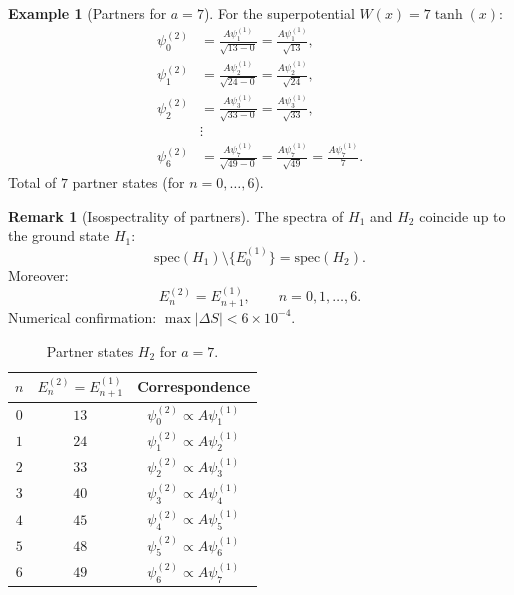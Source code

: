 \documentclass[11pt,a4paper]{article}
\theoremstyle{definition}
\newtheorem{remark}[theorem]{Remark}
\newtheorem{example}[theorem]{Example}
\begin{document}
\begin{example}[Partners for $a = 7$]
For the superpotential $W(x) = 7 \tanh(x)$:
\begin{align}
    \psi_0^{(2)} &= \frac{A \psi_1^{(1)}}{\sqrt{13 - 0}} 
                   = \frac{A \psi_1^{(1)}}{\sqrt{13}}, \\
    \psi_1^{(2)} &= \frac{A \psi_2^{(1)}}{\sqrt{24 - 0}} 
                   = \frac{A \psi_2^{(1)}}{\sqrt{24}}, \\
    \psi_2^{(2)} &= \frac{A \psi_3^{(1)}}{\sqrt{33 - 0}} 
                   = \frac{A \psi_3^{(1)}}{\sqrt{33}}, \\
    &\vdots \\
    \psi_6^{(2)} &= \frac{A \psi_7^{(1)}}{\sqrt{49 - 0}} 
                   = \frac{A \psi_7^{(1)}}{\sqrt{49}} = 
                   \frac{A \psi_7^{(1)}}{7}.
\end{align}
Total of $7$ partner states (for $n = 0, \ldots, 6$).
\end{example}

\begin{remark}[Isospectrality of partners]
The spectra of $H_1$ and $H_2$ coincide up to the ground state
$H_1$:
\begin{equation}
    \mathrm{spec}(H_1) \setminus \{E_0^{(1)}\} = \mathrm{spec}(H_2).
\end{equation}
Moreover:
\begin{equation}
    E_n^{(2)} = E_{n+1}^{(1)}, \qquad n = 0, 1, \ldots, 6.
\end{equation}
Numerical confirmation: $\max|\Delta S| < 6 \times 10^{-4}$.
\end{remark}

\begin{table}[htbp]
\centering
\caption{Partner states \texorpdfstring{$H_2$}{H\_2} for \texorpdfstring{$a = 7$}{a = 7}.}
\label{tab:partner-states}
\begin{tabular}{ccc}
\toprule
$n$ & $E_n^{(2)} = E_{n+1}^{(1)}$ & Correspondence \\
\midrule
$0$ & $13$ & $\psi_0^{(2)} \propto A \psi_1^{(1)}$ \\
$1$ & $24$ & $\psi_1^{(2)} \propto A \psi_2^{(1)}$ \\
$2$ & $33$ & $\psi_2^{(2)} \propto A \psi_3^{(1)}$ \\
$3$ & $40$ & $\psi_3^{(2)} \propto A \psi_4^{(1)}$ \\
$4$ & $45$ & $\psi_4^{(2)} \propto A \psi_5^{(1)}$ \\
$5$ & $48$ & $\psi_5^{(2)} \propto A \psi_6^{(1)}$ \\
$6$ & $49$ & $\psi_6^{(2)} \propto A \psi_7^{(1)}$ \\
\bottomrule
\end{tabular}
\end{table}
                                  
\end{document}
